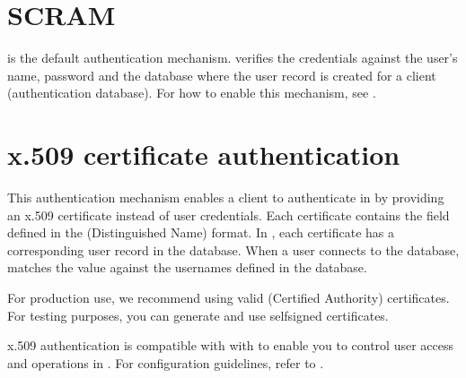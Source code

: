 \documentclass[letterpaper,10pt,english]{sphinxmanual}
\begin{document}
\section{SCRAM}
\label{\detokenize{authentication:scram}}\label{\detokenize{authentication:id1}}
\sphinxAtStartPar
{} is the default authentication mechanism.  verifies the credentials against the user’s name, password and the database where the user record is created for a client (authentication database). For how to enable this mechanism, see {\hyperref[\detokenize{enable-auth:enable-auth}]{}}.


\section{x.509 certificate authentication}
\label{\detokenize{authentication:x-509-certificate-authentication}}\label{\detokenize{authentication:x509}}
\sphinxAtStartPar
This authentication mechanism enables a client to authenticate in  by providing an x.509 certificate instead of user credentials. Each certificate contains the  field defined in the  (Distinguished Name) format. In , each certificate has a corresponding user record in the  database. When a user connects to the database,  matches the  value against the usernames defined in the  database.

\sphinxAtStartPar
For production use, we recommend using valid  (Certified Authority) certificates. For testing purposes, you can generate and use self\sphinxhyphen{}signed certificates.

\sphinxAtStartPar
x.509 authentication is compatible with with {\hyperref[\detokenize{authorization:ldap-authorization}]{}} to enable you to control user access and operations in . For configuration guidelines, refer to {\hyperref[\detokenize{x509-ldap:ldap-x509}]{}}.


\nopagebreak
\end{document}
